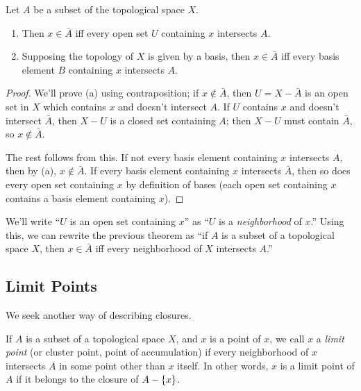 \documentclass[10pt]{report}
\begin{document}
\begin{theorem}
  Let $A$ be a subset of the topological space $X$.
  \begin{enumerate}[label={(\alph*)}]
    \item Then $x \in \bar A$ iff every open set $U$ containing $x$ intersects $A$.
    \item Supposing the topology of $X$ is given by a basis, then $x \in \bar A$ iff every basis element $B$ containing $x$ intersects $A$.
  \end{enumerate}
\end{theorem}
\begin{proof}
  We'll prove (a) using contraposition;
  if $x \notin \bar{A}$, then $U = X-\bar{A}$ is an open set in $X$ which contains $x$ and doesn't intersect $A$.
  If $U$ contains $x$ and doesn't intersect $\bar{A}$, then $X - U$ is a closed set containing $A$; then $X - U$ must contain $\bar A$, so $x \notin \bar A$.

  The rest follows from this.
  If not every basis element containing $x$ intersects $A$, then by (a), $x \notin \bar A$.
  If every basis element containing $x$ intersects $\bar A$, then so does every open set containing $x$ by definition of bases (each open set containing $x$ contains a basis element containing $x$).
\end{proof}

We'll write ``$U$ is an open set containing $x$'' as ``$U$ is a \emph{neighborhood} of $x$.''
Using this, we can rewrite the previous theorem as ``if $A$ is a subset of a topological space $X$, then $x \in \bar{A}$ iff every neighborhood of $X$ intersects $A$.''

\subsection{Limit Points}
We seek another way of describing closures.
\begin{definition}
  If $A$ is a subset of a topological space $X$, and $x$ is a point of $x$, we call $x$ a \emph{limit point} (or cluster point, point of accumulation) if every neighborhood of $x$ intersects $A$ in some point other than $x$ itself.
  In other words, $x$ is a limit point of $A$ if it belongs to the closure of $A - \left\{ x \right\}$.
\end{definition}
\end{document}
